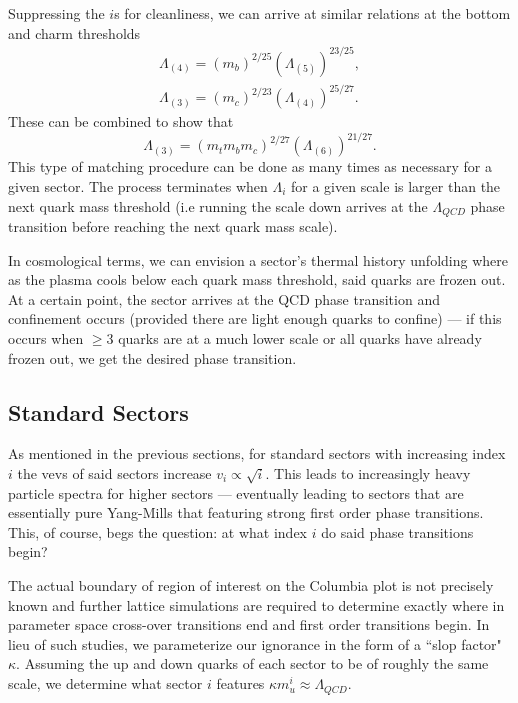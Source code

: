 \documentclass[nofootinbib,twocolumn,preprintnumbers]{revtex4-1}
\begin{document}
Suppressing the $i$s for cleanliness, we can arrive at similar relations at the bottom and charm thresholds
\begin{equation}
\begin{split}
\Lambda_{(4)} = (m_b)^{2/25}(\Lambda_{(5)})^{23/25},
\\
\Lambda_{(3)} = (m_c)^{2/23}(\Lambda_{(4)})^{25/27}.
\end{split}
\end{equation}
These can be combined to show that
\begin{equation}
\Lambda_{(3)} = (m_t m_b m_c)^{2/27}(\Lambda_{(6)})^{21/27}.
\end{equation}
This type of matching procedure can be done as many times as necessary for a given sector. The process terminates when $\Lambda_i$ for a given scale is larger than the next quark mass threshold (i.e running the scale down arrives at the $\Lambda_{QCD}$ phase transition before reaching the next quark mass scale).

In cosmological terms, we can envision a sector's thermal history unfolding where as the plasma cools below each quark mass threshold, said quarks are frozen out. At a certain point, the sector arrives at the QCD phase transition and confinement occurs (provided there are light enough quarks to confine) --- if this occurs when $\geq 3$ quarks are at a much lower scale or all quarks have already frozen out, we get the desired phase transition.   

\subsection{Standard Sectors}



As mentioned in the previous sections, for standard sectors with increasing index $i$ the vevs of said sectors increase $v_i\propto \sqrt{i}$. This leads to increasingly heavy particle spectra for higher sectors --- eventually leading to sectors that are essentially pure Yang-Mills that featuring strong first order phase transitions. This, of course, begs the question: at what index $i$ do said phase transitions begin?

The actual boundary of region of interest on the Columbia plot is not precisely known and further lattice simulations are required to determine exactly where in parameter space cross-over transitions end and first order transitions begin. In lieu of such studies, we parameterize our ignorance in the form of a ``slop factor" $\kappa$. Assuming the up and down quarks of each sector to be of roughly the same scale, we determine what sector $i$ features $\kappa m_u^i \approx \Lambda_{QCD}$.
\end{document}
